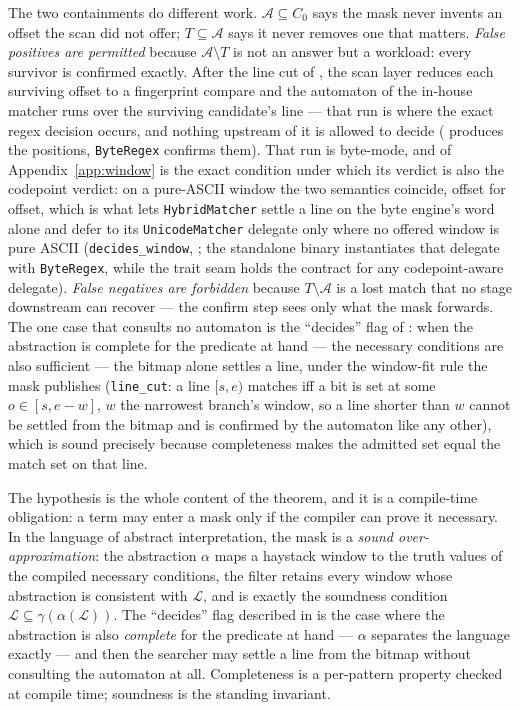 \documentclass[11pt,letterpaper]{article}
\begin{document}
The two containments do different work. $\mathcal{A}\subseteq C_0$ says the
mask never invents an offset the scan did not offer; $T\subseteq\mathcal{A}$
says it never removes one that matters. \emph{False positives are permitted}
because $\mathcal{A}\setminus T$ is not an answer but a workload: every
survivor is confirmed exactly. After the line cut of , the
scan layer reduces each surviving offset to a fingerprint compare and the
automaton of the in-house matcher runs over the surviving candidate's line
--- that run is where the exact regex decision occurs, and nothing upstream
of it is allowed to decide ( produces
the positions, \texttt{ByteRegex} confirms them). That run is byte-mode,
and  of Appendix~\ref{app:window} is the exact condition
under which its verdict is also the codepoint verdict: on a pure-ASCII
window the two semantics coincide, offset for offset, which is what lets
\texttt{HybridMatcher} settle a line on the byte engine's word alone and
defer to its \texttt{UnicodeMatcher} delegate only where no offered window
is pure ASCII (\texttt{decides\_window},
; the standalone binary instantiates
that delegate with \texttt{ByteRegex}, while the trait seam holds the
contract for any codepoint-aware delegate).
\emph{False negatives are
forbidden} because $T\setminus\mathcal{A}$ is a lost match that no stage
downstream can recover --- the confirm step sees only what the mask forwards.
The one case that consults no automaton is the ``decides'' flag of
: when the abstraction is complete for the predicate at hand
--- the necessary conditions are also sufficient --- the bitmap alone
settles a line, under the window-fit rule the mask publishes
(\texttt{line\_cut}: a line $[s,e)$ matches iff a bit is set at some
$o\in[s,e-w]$, $w$ the narrowest branch's window, so a line shorter than $w$
cannot be settled from the bitmap and is confirmed by the automaton like any
other), which is sound precisely because completeness makes the admitted set
equal the match set on that line.

The hypothesis is the whole content of the theorem, and it is a compile-time
obligation: a term may enter a mask only if the compiler can prove it
necessary. In the language of abstract interpretation, the mask is a
\emph{sound over-approximation}: the abstraction $\alpha$ maps a haystack
window to the truth values of the compiled necessary conditions, the filter
retains every window whose abstraction is consistent with $\mathcal{L}$, and
 is exactly the soundness condition
$\mathcal{L}\subseteq\gamma(\alpha(\mathcal{L}))$. The ``decides'' flag
described in  is the case where the abstraction is also
\emph{complete} for the predicate at hand --- $\alpha$ separates the
language exactly --- and then the searcher may settle a line from the bitmap
without consulting the automaton at all. Completeness is a per-pattern
property checked at compile time; soundness is the standing invariant.
\end{document}
